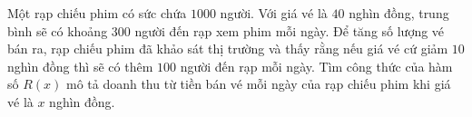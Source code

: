 \begin{bt}%
Một rạp chiếu phim có sức chứa $1000$ người. Với giá vé là $40$ nghìn đồng, trung bình sẽ có khoảng $300$ người đến rạp xem phim mỗi ngày. Để tăng số lượng vé bán ra, rạp chiếu phim đã khảo sát thị trường và thấy rằng nếu giá vé cứ giảm $10$ nghìn đồng thì sẽ có thêm $100$ người đến rạp mỗi ngày. Tìm công thức của hàm số $R(x)$ mô tả doanh thu từ tiền bán vé mỗi ngày của rạp chiếu phim khi giá vé là $x$ nghìn đồng.\\
\end{bt}